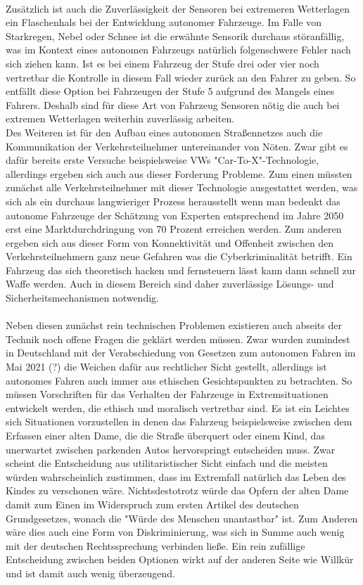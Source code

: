 \documentclass[10pt,a4paper]{article}
\begin{document}
\\
Zusätzlich ist auch die Zuverlässigkeit der Sensoren bei extremeren Wetterlagen ein Flaschenhals bei der Entwicklung autonomer Fahrzeuge. Im Falle von Starkregen, Nebel oder Schnee ist die erwähnte Sensorik durchaus störanfällig, was im Kontext eines autonomen Fahrzeugs natürlich folgenschwere Fehler nach sich ziehen kann.  Ist es bei einem Fahrzeug der Stufe drei oder vier noch vertretbar die Kontrolle in diesem Fall wieder zurück an den Fahrer zu geben. So entfällt diese Option bei Fahrzeugen der Stufe 5 aufgrund des Mangels eines Fahrers. Deshalb sind für diese Art von Fahrzeug Sensoren nötig die auch bei extremen Wetterlagen weiterhin zuverlässig arbeiten.
\\
Des Weiteren ist für den Aufbau eines autonomen Straßennetzes auch die Kommunikation der Verkehrsteilnehmer untereinander von Nöten. Zwar gibt es dafür bereits erste Versuche beispielsweise VWs "Car-To-X"-Technologie, allerdings ergeben sich auch aus dieser Forderung Probleme. Zum einen müssten zunächst alle Verkehrsteilnehmer mit dieser Technologie ausgestattet werden, was sich als ein durchaus langwieriger Prozess herausstellt wenn man bedenkt das autonome Fahrzeuge der Schätzung von Experten entsprechend im Jahre 2050 erst eine Marktdurchdringung von 70 Prozent erreichen werden. Zum anderen ergeben sich aus dieser Form von Konnektivität und Offenheit zwischen den Verkehrsteilnehmern ganz neue Gefahren was die Cyberkriminalität betrifft. Ein Fahrzeug das sich theoretisch hacken und fernsteuern lässt kann dann schnell zur Waffe werden. Auch in diesem Bereich sind daher zuverlässige Lösungs- und Sicherheitsmechanismen notwendig. 
\\
\\
Neben diesen zunächst rein technischen Problemen existieren auch abseits der Technik noch offene Fragen die geklärt werden müssen. Zwar wurden zumindest in Deutschland mit der Verabschiedung von Gesetzen zum autonomen Fahren im Mai 2021 (?) die Weichen dafür aus rechtlicher Sicht gestellt, allerdings ist autonomes Fahren auch immer aus ethischen Gesichtspunkten zu betrachten. So müssen Vorschriften für das Verhalten der Fahrzeuge in Extremsituationen entwickelt werden, die ethisch und moralisch vertretbar sind. Es ist ein Leichtes sich Situationen vorzustellen in denen das Fahrzeug beispielsweise zwischen dem Erfassen einer alten Dame, die die Straße überquert oder einem Kind, das unerwartet zwischen parkenden Autos hervorspringt entscheiden muss. Zwar scheint die Entscheidung aus utilitaristischer Sicht einfach und die meisten würden wahrscheinlich zustimmen, dass im Extremfall natürlich das Leben des Kindes zu verschonen wäre. Nichtsdestotrotz würde das Opfern der alten Dame damit zum Einen im Widerspruch zum ersten Artikel des deutschen Grundgesetzes, wonach die "Würde des Menschen unantastbar" ist. Zum Anderen wäre dies auch eine Form von Diskriminierung, was sich in Summe auch wenig mit der deutschen Rechtssprechung verbinden ließe. Ein rein zufällige Entscheidung zwischen beiden Optionen wirkt auf der anderen Seite wie Willkür und ist damit auch wenig überzeugend. 
\end{document}
